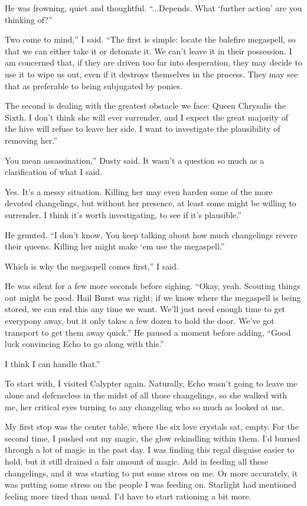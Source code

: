 He was frowning, quiet and thoughtful. “...Depends. What ‘further action’ are you thinking of?”

\leavevmode{}Two come to mind,” I said. “The first is simple: locate the balefire megaspell, so that we can either take it or detonate it. We can’t leave it in their possession. I am concerned that, if they are driven too far into desperation, they may decide to use it to wipe us out, even if it destroys themselves in the process. They may see that as preferable to being subjugated by ponies.

\leavevmode{}The second is dealing with the greatest obstacle we face: Queen Chrysalis the Sixth. I don’t think she will ever surrender, and I expect the great majority of the hive will refuse to leave her side. I want to investigate the plausibility of removing her.”

\leavevmode{}You mean assassination,” Dusty said. It wasn’t a question so much as a clarification of what I said.

\leavevmode{}Yes. It’s a messy situation. Killing her may even harden some of the more devoted changelings, but without her presence, at least some might be willing to surrender. I think it’s worth investigating, to see if it’s plausible.”

He grunted. “I don’t know. You keep talking about how much changelings revere their queens. Killing her might make ‘em use the megaspell.”

\leavevmode{}Which is why the megaspell comes first,” I said.

He was silent for a few more seconds before sighing. “Okay, yeah. Scouting things out might be good. Hail Burst was right; if we know where the megaspell is being stored, we can end this any time we want. We’ll just need enough time to get everypony away, but it only takes a few dozen to hold the door. We’ve got transport to get them away quick.” He paused a moment before adding, “Good luck convincing Echo to go along with this.”

\leavevmode{}I think I can handle that.”

{\br}%
To start with, I visited Calypter again. Naturally, Echo wasn’t going to leave me alone and defenseless in the midst of all those changelings, so she walked with me, her critical eyes turning to any changeling who so much as looked at me.

My first stop was the center table, where the six love crystals sat, empty. For the second time, I pushed out my magic, the glow rekindling within them. I’d burned through a lot of magic in the past day. I was finding this regal disguise easier to hold, but it still drained a fair amount of magic. Add in feeding all these changelings, and it was starting to put some stress on me. Or more accurately, it was putting some stress on the people I was feeding on. Starlight had mentioned feeling more tired than usual. I’d have to start rationing a bit more.

